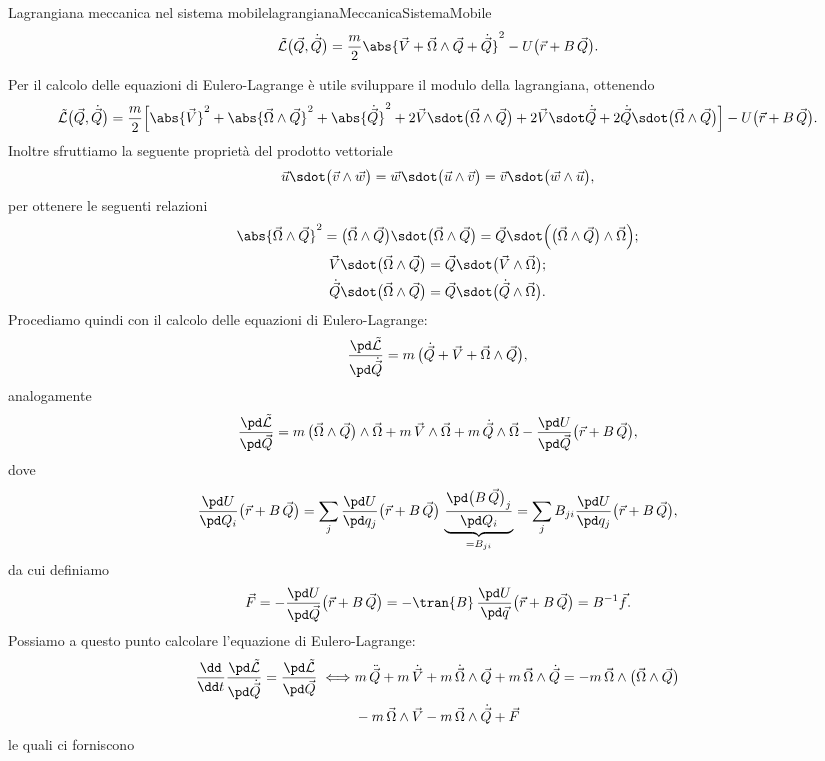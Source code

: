 \begin{remark}{Lagrangiana meccanica nel sistema mobile}{lagrangianaMeccanicaSistemaMobile}
	\[
		\tilde{\mathcal{L}}\big(\vec{Q},\dot{\vec{Q}}\big) = \frac{m}{2}\abs{\vec{V}+\vec{\Omega}\wedge\vec{Q} + \dot{\vec{Q}}}^2 - U\big(\vec{r}+B\,\vec{Q}\big).
	\]
\end{remark}
\noindent
Per il calcolo delle equazioni di Eulero-Lagrange è utile sviluppare il modulo della  lagrangiana, ottenendo
\[
	\tilde{\mathcal{L}}\big(\vec{Q},\dot{\vec{Q}}\big) = \frac{m}{2}\Big[\abs{\vec{V}}^2+\abs{\vec{\Omega}\wedge\vec{Q}}^2+\abs{\dot{\vec{Q}}}^2+2\vec{V}\sdot\big(\vec{\Omega}\wedge\vec{Q}\big)+2\vec{V}\sdot\dot{\vec{Q}}+2\dot{\vec{Q}}\sdot\big(\vec{\Omega}\wedge\vec{Q}\big)\Big] - U\big(\vec{r}+B\,\vec{Q}\big).
\]
Inoltre sfruttiamo la seguente proprietà del prodotto vettoriale
\[
	\vec{u}\sdot\big(\vec{v}\wedge\vec{w}\big) = \vec{w}\sdot\big(\vec{u}\wedge\vec{v}\big) = \vec{v}\sdot\big(\vec{w}\wedge\vec{u}\big),
\]
per ottenere le seguenti relazioni
\begin{gather*}
	\abs{\vec{\Omega}\wedge\vec{Q}}^2 = \big(\vec{\Omega}\wedge\vec{Q}\big) \sdot \big(\vec{\Omega}\wedge\vec{Q}\big) = \vec{Q} \sdot \Big(\big(\vec{\Omega}\wedge\vec{Q}\big)\wedge\vec{\Omega}\Big);\\
	\vec{V} \sdot \big(\vec{\Omega}\wedge\vec{Q}\big) = \vec{Q} \sdot \big(\vec{V}\wedge\vec{\Omega}\big);\\
	\dot{\vec{Q}}\sdot\big(\vec{\Omega}\wedge\vec{Q}\big) = \vec{Q}\sdot\big(\dot{\vec{Q}}\wedge\vec{\Omega}\big).
\end{gather*}
Procediamo quindi con il calcolo delle equazioni di Eulero-Lagrange:
\[
	\frac{\pd\tilde{\mathcal{L}}}{\pd\dot{\vec{Q}}} = m\,\big(\dot{\vec{Q}}+\vec{V}+\vec{\Omega}\wedge\vec{Q}\big),
\]
analogamente
\[
	\frac{\pd\tilde{\mathcal{L}}}{\pd\vec{Q}} = m\,\big(\vec{\Omega}\wedge\vec{Q}\big)\wedge\vec{\Omega} + m\,\vec{V}\wedge\vec{\Omega} + m\,\dot{\vec{Q}}\wedge\vec{\Omega} - \frac{\pd U}{\pd\vec{Q}}\big(\vec{r}+B\,\vec{Q}\big),
\]
dove
\[
	\frac{\pd U}{\pd Q_i}\big(\vec{r}+B\,\vec{Q}\big) = \sum_j \frac{\pd U}{\pd q_j}\big(\vec{r}+B\,\vec{Q}\big)\,\underbrace{\frac{\pd\big(B\,\vec{Q}\big)_j}{\pd Q_i}}_{=B_{ji}} = \sum_j B_{ji}\frac{\pd U}{\pd q_j}\big(\vec{r}+B\,\vec{Q}\big),
\]
da cui definiamo
\[
	\vec{F} = -\frac{\pd U}{\pd\vec{Q}}\big(\vec{r}+B\,\vec{Q}\big) = -\tran{B}\,\frac{\pd U}{\pd\vec{q}}\big(\vec{r}+B\,\vec{Q}\big) = B^{-1}\vec{f}.
\]
Possiamo a questo punto calcolare l'equazione di Eulero-Lagrange:
\[
	\begin{split}
		\frac{\dd}{\dd t}\frac{\pd\tilde{\mathcal{L}}}{\pd\dot{\vec{Q}}} = \frac{\pd\tilde{\mathcal{L}}}{\pd\vec{Q}}  \iff & m\,\ddot{\vec{Q}} +m\,\dot{\vec{V}} + m\,\dot{\vec{\Omega}}\wedge\vec{Q} + m\,\vec{\Omega}\wedge\dot{\vec{Q}} = -m\,\vec{\Omega} \wedge\big(\vec{\Omega}\wedge\vec{Q}\big) \\
		& -m\,\vec{\Omega}\wedge\vec{V} -m\,\vec{\Omega}\wedge\dot{\vec{Q}}+\vec{F}
	\end{split}
\]
le quali ci forniscono

